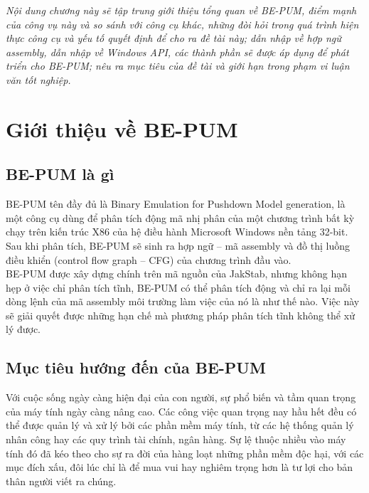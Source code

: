 
\begin{concept}[15cm]
\textit{Nội dung chương này sẽ tập trung giới thiệu tổng quan về BE-PUM, điểm mạnh của công vụ này và so sánh với công cụ khác, những đòi hỏi trong quá trình hiện thực công cụ và yếu tố quyết  định để cho ra đề tài này; dẫn nhập về hợp ngữ assembly, dẫn nhập về Windows API, các thành phần sẽ được áp dụng để phát triển cho BE-PUM; nêu ra mục tiêu của đề tài và giới hạn trong phạm vi luận văn tốt nghiệp.}
\end{concept}

\section{Giới thiệu về BE-PUM}
	\subsection{BE-PUM là gì}

BE-PUM tên đầy đủ là Binary Emulation for Pushdown Model generation, là một công cụ dùng để phân tích động mã nhị phân của một chương trình bất kỳ chạy trên kiến trúc X86 của hệ điều hành Microsoft Windows nền tảng 32-bit. Sau khi phân tích, BE-PUM sẽ sinh ra hợp ngữ – mã assembly và đồ thị luồng điều khiển (control flow graph – CFG) của chương trình đầu vào.\\

BE-PUM được xây dựng chính trên mã nguồn của JakStab, nhưng không hạn hẹp ở việc chỉ phân tích tĩnh, BE-PUM có thể phân tích động và chỉ ra lại mỗi dòng lệnh của mã assembly môi trường làm việc của nó là như thế nào. Việc này sẽ giải quyết được những hạn chế mà phương pháp phân tích tĩnh không thể xử lý được.

	\subsection{Mục tiêu hướng đến của BE-PUM}

Với cuộc sống ngày càng hiện đại của con người, sự phổ biến và tầm quan trọng của máy tính ngày càng nâng cao. Các công việc quan trọng nay hầu hết đều có thể được quản lý và xử lý bởi các phần mềm máy tính, từ các hệ thống quản lý nhân công hay các quy trình tài chính, ngân hàng. Sự lệ thuộc nhiều vào máy tính đó đã kéo theo cho sự ra đời của hàng loạt những phần mềm độc hại, với các mục đích xấu, đôi lúc chỉ là để mua vui hay nghiêm trọng hơn là tư lợi cho bản thân người viết ra chúng. \\

